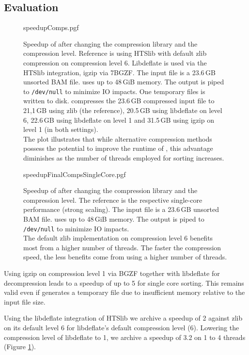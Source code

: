 \subsection{Evaluation}
\begin{figure}[t]
        {speedupComps.pgf}
    \caption{Speedup of \sort after changing the compression library and the compression level. Reference is \sort using HTSlib with default zlib compression on compression level 6. Libdeflate is used via the HTSlib integration, igzip via 7BGZF. The input file is a 23.6\,GB unsorted BAM file. \sort uses up to 48\,GiB memory. The output is piped to \texttt{/dev/null} to minimize IO impacts. One temporary files is written to disk. \sort compresses the 23.6\,GB compressed input file to 21,1\,GB using zlib (the reference), 20.5\,GB using libdeflate on level 6, 22.6\,GB using libdeflate on level 1 and 31.5\,GB using igzip on level 1 (in both settings). \parents \threads \points\\
    The plot illustrates that while alternative compression methods possess the potential to improve the runtime of \sort, this advantage diminishes as the number of threads employed for sorting increases.}
    \label{fig:speedupCompression}
\end{figure}
\begin{figure}[!h]
        {speedupFinalCompsSingleCore.pgf}
    \caption{Speedup of \sort after changing the compression library and the compression level. The reference is the respective single-core performance (strong scaling). The input file is a 23.6\,GB unsorted BAM file. \sort uses up to 48\,GiB memory. The output is piped to \texttt{/dev/null} to minimize IO impacts. \parents \threads \points\\
    The default zlib implementation on compression level 6 benefits most from a higher number of threads. The faster the compression speed, the less benefits come from using a higher number of threads.}
    \label{fig:speedupSingle}
\end{figure}
Using igzip on compression level 1 via BGZF together with libdeflate for decompression leads to a speedup of up to 5 for single core sorting. This remains valid even if \sort generates a temporary file due to insufficient memory relative to the input file size.

Using the libdeflate integration of HTSlib we archive a speedup of 2 against zlib on its default level 6 for libdeflate's default compression level (6). Lowering the compression level of libdeflate to 1, we archive a speedup of 3.2 on 1 to 4 threads (Figure \ref{fig:speedupCompression}).

